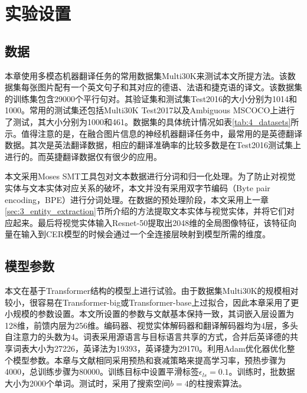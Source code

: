\section{实验设置}
\label{sec:4_setup}

\subsection{数据}
\label{sec:4_dataset}


本章使用多模态机器翻译任务的常用数据集Multi30K\cite{43_elliott-etal-2016-multi30k}来测试本文所提方法。该数据集每张图片配有一个英文句子和其对应的德语、法语和捷克语的译文。该数据集的训练集包含29000个平行句对。其验证集和测试集Test2016的大小分别为1014和1000。常用的测试集还包括Multi30K Test2017以及Ambiguous MSCOCO上进行了测试，其大小分别为1000和461。数据集的具体统计情况如表\ref{tab:4_datasets}所示。值得注意的是，在融合图片信息的神经机器翻译任务中，最常用的是英德翻译数据。其次是英法翻译数据，相应的翻译准确率的比较多数是在Test2016测试集上进行的。而英捷翻译数据仅有很少的应用。

本文采用Moses SMT\cite{44_koehn-etal-2007-moses}工具包对文本数据进行分词和归一化处理。为了防止对视觉实体与文本实体对应关系的破坏，本文并没有采用双字节编码\cite{27_sennrich-etal-2016-neural}（Byte pair encoding，BPE）进行分词处理。在数据的预处理阶段，本文采用上一章\ref{sec:3_entity_extraction}节所介绍的方法提取文本实体与视觉实体，并将它们对应起来。最后将视觉实体输入Resnet-50\cite{32_DBLP:conf/cvpr/HeZRS16}提取出2048维的全局图像特征，该特征向量在输入到CER模型的时候会通过一个全连接层映射到模型所需的维度。

\subsection{模型参数}
\label{sec:4_model_setup}

本文在基于Transformer\cite{5_DBLP:journals/corr/VaswaniSPUJGKP17}结构的模型上进行试验。由于数据集Multi30K的规模相对较小，很容易在Transformer-big或Transformer-base上过拟合，因此本章采用了更小规模的参数设置。本文所设置的参数与文献\cite{33_yin-etal-2020-novel}基本保持一致，其词嵌入层设置为128维，前馈内层为256维。编码器、视觉实体解码器和翻译解码器均为4层，多头自注意力的头数为4。词表采用源语言与目标语言共享的方式，合并后英译德的共享词表大小为27226，英译法为19393，英译捷为29170。利用Adam\cite{34_DBLP:journals/corr/KingmaB14}优化器优化整个模型参数。本章与文献\cite{5_DBLP:journals/corr/VaswaniSPUJGKP17}相同采用预热和衰减策略来提高学习率，预热步骤为4000，总训练步骤为80000。训练目标中设置平滑标签$\epsilon_{ls}=0.1$。训练时，批数据大小为2000个单词。测试时，采用了搜索空间$b=4$的柱搜索算法。


